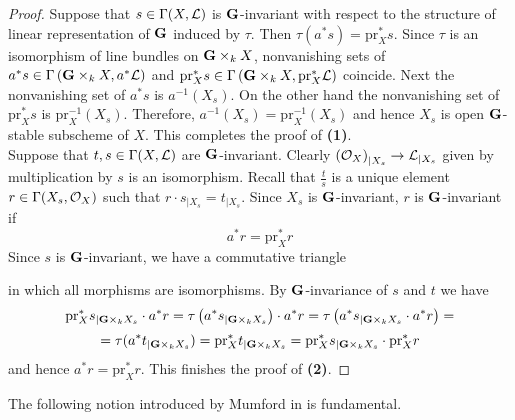 \begin{proof}
Suppose that $s\in \Gamma(X,{\mathcal L})$ is $\mathbf{G}$-invariant with respect to the structure of linear representation of $\mathbf{G}$ induced by $\tau$. Then $\tau(a^*s) = \mathrm{pr}_X^*s$. Since $\tau$ is an isomorphism of line bundles on $\mathbf{G}\times_kX$, nonvanishing sets of $a^*s \in \Gamma\left(\mathbf{G}\times_kX,a^*{\mathcal L}\right)$ and $\mathrm{pr}_X^*s \in \Gamma\left(\mathbf{G}\times_kX,\mathrm{pr}_X^*{\mathcal L}\right)$ coincide. Next the nonvanishing set of $a^*s$ is $a^{-1}(X_s)$. On the other hand the nonvanishing set of $\mathrm{pr}_X^*s$ is $\mathrm{pr}_X^{-1}(X_s)$. Therefore, $a^{-1}(X_s) = \mathrm{pr}_X^{-1}(X_s)$ and hence $X_s$ is open $\mathbf{G}$-stable subscheme of $X$. This completes the proof of \textbf{(1)}.\\
Suppose that $t,s\in \Gamma(X,{\mathcal L})$ are $\mathbf{G}$-invariant. Clearly $\left({\mathcal O}_{X}\right)_{\mid X_s} \rightarrow {\mathcal L}_{\mid X_s}$ given by multiplication by $s$ is an isomorphism. Recall that $\frac{t}{s}$ is a unique element $r \in \Gamma(X_s,{\mathcal O}_X)$ such that $r\cdot s_{\mid X_s} = t_{\mid X_s}$. Since $X_s$ is $\mathbf{G}$-invariant, $r$ is $\mathbf{G}$-invariant if 
$$a^*r = \mathrm{pr}_X^*r$$
Since $s$ is $\mathbf{G}$-invariant, we have a commutative triangle
\begin{center}
\end{center}
in which all morphisms are isomorphisms. By $\mathbf{G}$-invariance of $s$ and $t$ we have
$$\mathrm{pr}_X^*s_{\mid \mathbf{G}\times_kX_s} \cdot a^*r = \tau\left(a^*s_{\mid \mathbf{G}\times_kX_s}\right)\cdot a^*r = \tau\left(a^*s_{\mid \mathbf{G}\times_kX_s}\cdot a^*r\right) =$$
$$= \tau(a^*t_{\mid \mathbf{G}\times_kX_s}) = \mathrm{pr}_X^*t_{\mid \mathbf{G}\times_kX_s} = \mathrm{pr}_X^*s_{\mid \mathbf{G}\times_kX_s}\cdot \mathrm{pr}_X^*r$$
and hence $a^*r = \mathrm{pr}_X^*r$. This finishes the proof of \textbf{(2)}.
\end{proof}
\noindent
The following notion introduced by Mumford in \cite{mumford1994geometric} is fundamental.

